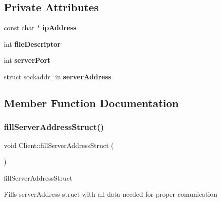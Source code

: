 \subsection*{Private Attributes}
\begin{DoxyCompactItemize}
\item 
\mbox{\label{classClient_af4529e7aa1a4e33f1188eec378aa67ca}} 
const char $\ast$ {\bfseries ip\+Address}
\item 
\mbox{\label{classClient_a8f39b17f10ded0b0e5002e40c13bdde4}} 
int {\bfseries file\+Descriptor}
\item 
\mbox{\label{classClient_a4345c8b8a92e6fb5a66e89694ef003e1}} 
int {\bfseries server\+Port}
\item 
\mbox{\label{classClient_a9886b7cfa9b826616d28160c47d6dd89}} 
struct sockaddr\+\_\+in {\bfseries server\+Address}
\end{DoxyCompactItemize}


\subsection{Member Function Documentation}
\mbox{\label{classClient_a214cdda23175ba7cc4f94037730cbfd4}} 
\subsubsection{\texorpdfstring{fill\+Server\+Address\+Struct()}{fillServerAddressStruct()}}
{\footnotesize\ttfamily void Client\+::fill\+Server\+Address\+Struct (\begin{DoxyParamCaption}{ }\end{DoxyParamCaption})\hspace{0.3cm}{\ttfamily [private]}}



fill\+Server\+Address\+Struct 

Fills server\+Address struct with all data needed for proper comunication \mbox{\label{classClient_a68e3bdb6ca10ee50268f219d58b6a3e3}} 
